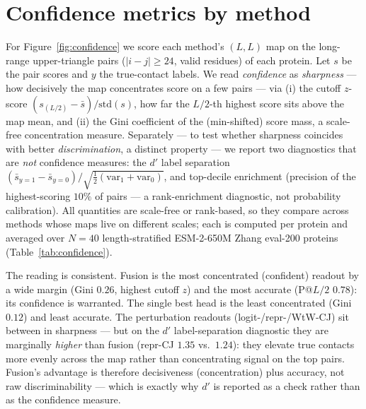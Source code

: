 \documentclass{article}
\begin{document}
\section{Confidence metrics by method}
\label{app:confidence}

For Figure~\ref{fig:confidence} we score each method's $(L,L)$ map on the
long-range upper-triangle pairs ($|i-j|\geq 24$, valid residues) of each
protein. Let $s$ be the pair scores and $y$ the true-contact labels. We read
\emph{confidence} as \emph{sharpness} --- how decisively the map concentrates
score on a few pairs --- via (i) the cutoff $z$-score
$(s_{(L/2)}-\bar s)/\mathrm{std}(s)$, how far the $L/2$-th highest score sits
above the map mean, and (ii) the Gini coefficient of the (min-shifted) score
mass, a scale-free concentration measure. Separately --- to test whether
sharpness coincides with better \emph{discrimination}, a distinct property --- we
report two diagnostics that are \emph{not} confidence measures: the $d'$ label
separation $(\bar s_{y=1}-\bar s_{y=0})/\sqrt{\tfrac12(\mathrm{var}_{1}+\mathrm{var}_{0})}$,
and top-decile enrichment (precision of the highest-scoring $10\%$ of pairs --- a
rank-enrichment diagnostic, not probability calibration). All quantities are
scale-free or rank-based, so they compare across methods whose maps live on
different scales; each is computed per protein and averaged over $N{=}40$
length-stratified ESM-2-650M Zhang eval-200 proteins (Table~\ref{tab:confidence}).

The reading is consistent. Fusion is the most concentrated (confident) readout
by a wide margin (Gini $0.26$, highest cutoff $z$) and the most accurate
(P@$L/2$ $0.78$): its confidence is warranted. The single best head is the least
concentrated (Gini $0.12$) and least accurate. The perturbation readouts
(logit-/repr-/WtW-CJ) sit between in sharpness --- but on the $d'$
label-separation diagnostic they are marginally \emph{higher} than fusion
(repr-CJ $1.35$ vs.\ $1.24$): they elevate true contacts more evenly across the
map rather than concentrating signal on the top pairs. Fusion's advantage is
therefore decisiveness (concentration) plus accuracy, not raw discriminability
--- which is exactly why $d'$ is reported as a check rather than as the
confidence measure.
\end{document}
